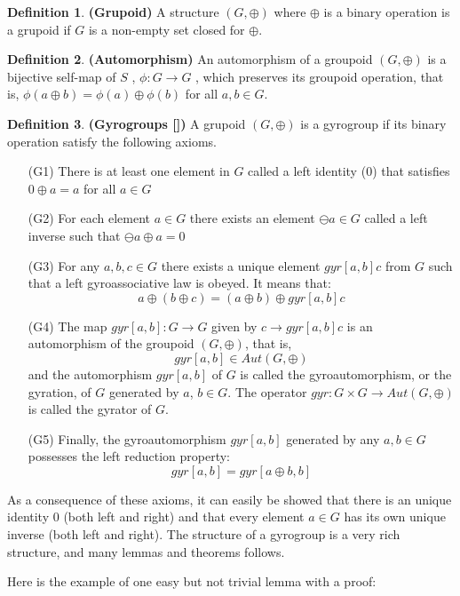 \documentclass[a4paper]{article}
\theoremstyle{definition}
\newtheorem{definition}{Definition}[section]
\begin{document}
\begin{definition} \textbf{(Grupoid)} A structure $(G, \oplus)$ where $\oplus$ is a binary operation is a grupoid if $G$ is a non-empty set closed for $\oplus$.
\end{definition}
\begin{definition} \textbf{(Automorphism)} An
automorphism of a groupoid $(G , \oplus)$ is a bijective self-map of $S$ , $ \phi: G \rightarrow G$ , which preserves its groupoid operation, that is,
$\phi (a\oplus b) = \phi (a) \oplus \phi (b)$ for all $a, b\in G$.
\end{definition}
\begin{definition} \textbf{(Gyrogroups [])}  A grupoid $(G, \oplus)$ is a gyrogroup if its binary operation satisfy the following axioms.
\begin{itemize}
\item[(G1)] There is at least one element in $G$ called a left identity ($0$) that satisfies $0\oplus a = a$ for all $a\in G$
\item[(G2)] For each element $a\in G$ there exists an element $\ominus a\in G$ called a left inverse such that $\ominus a \oplus a = 0$
\item[(G3)] For any $a, b, c \in G$ there exists a unique element $gyr[a,b]c$ from $G$ such that a left gyroassociative law is obeyed. It means that:
$$a\oplus (b \oplus c) = (a\oplus b) \oplus gyr[a,b]c$$
\item[(G4)] The map $gyr[a, b] : G \rightarrow G$ given by $c \rightarrow gyr[a, b]c$ is an automorphism of the groupoid $(G, \oplus)$, that is,
$$gyr[a, b] \in Aut(G, \oplus)$$
and the automorphism $gyr[a, b]$ of $G$ is called the gyroautomorphism, or the gyration, of $G$ generated by $a$, $b \in G$. The operator $gyr : G \times G \rightarrow Aut(G, \oplus)$ is called the gyrator of $G$. \
\item[(G5)] Finally, the gyroautomorphism $gyr[a, b]$ generated by any $a, b \in G$ possesses the left reduction property:
$$gyr[a, b] = gyr[a\oplus b, b]$$ 
\end{itemize}
\end{definition}

As a consequence of these axioms, it can easily be showed that there
is an unique identity $0$ (both left and right) and that every element
$a\in G$ has its own unique inverse (both left and right). The
structure of a gyrogroup is a very rich structure, and many lemmas and
theorems follows.

Here is the example of one easy but not trivial lemma with a proof:
\end{document}
